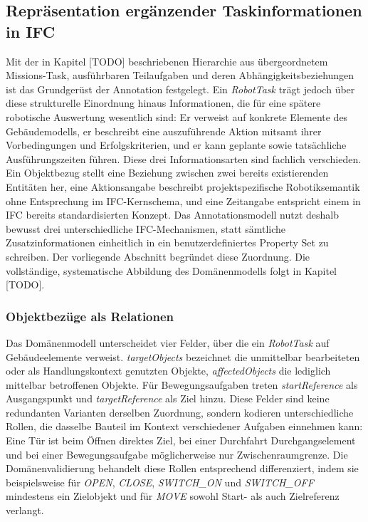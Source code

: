\subsection{Repräsentation ergänzender Taskinformationen in IFC}\label{subsec:Taskinformationen}
Mit der in Kapitel [TODO] beschriebenen Hierarchie aus übergeordnetem Missions-Task, ausführbaren
Teilaufgaben und deren Abhängigkeitsbeziehungen ist das Grundgerüst der Annotation festgelegt. Ein
\textit{RobotTask} trägt jedoch über diese strukturelle Einordnung hinaus Informationen, die für
eine spätere robotische Auswertung wesentlich sind: Er verweist auf konkrete Elemente des
Gebäudemodells, er beschreibt eine auszuführende Aktion mitsamt ihrer Vorbedingungen und
Erfolgskriterien, und er kann geplante sowie tatsächliche Ausführungszeiten führen. Diese drei
Informationsarten sind fachlich verschieden. Ein Objektbezug stellt eine Beziehung zwischen zwei
bereits existierenden Entitäten her, eine Aktionsangabe beschreibt projektspezifische
Robotiksemantik ohne Entsprechung im IFC-Kernschema, und eine Zeitangabe entspricht einem in IFC
bereits standardisierten Konzept. Das Annotationsmodell nutzt deshalb bewusst drei unterschiedliche
IFC-Mechanismen, statt sämtliche Zusatzinformationen einheitlich in ein benutzerdefiniertes Property
Set zu schreiben. Der vorliegende Abschnitt begründet diese Zuordnung. Die vollständige,
systematische Abbildung des Domänenmodells folgt in Kapitel [TODO].

\subsubsection{Objektbezüge als Relationen}
Das Domänenmodell unterscheidet vier Felder, über die ein \textit{RobotTask} auf Gebäudeelemente
verweist. \textit{targetObjects} bezeichnet die unmittelbar bearbeiteten oder als Handlungskontext
genutzten Objekte, \textit{affectedObjects} die lediglich mittelbar betroffenen Objekte. Für
Bewegungsaufgaben treten \textit{startReference} als Ausgangspunkt und \textit{targetReference} als
Ziel hinzu. Diese Felder sind keine redundanten Varianten derselben Zuordnung, sondern kodieren
unterschiedliche Rollen, die dasselbe Bauteil im Kontext verschiedener Aufgaben einnehmen kann: Eine
Tür ist beim Öffnen direktes Ziel, bei einer Durchfahrt Durchgangselement und bei einer
Bewegungsaufgabe möglicherweise nur Zwischenraumgrenze. Die Domänenvalidierung behandelt diese
Rollen entsprechend differenziert, indem sie beispielsweise für \textit{OPEN}, \textit{CLOSE},
\textit{SWITCH\_ON} und \textit{SWITCH\_OFF} mindestens ein Zielobjekt und für \textit{MOVE} sowohl
Start- als auch Zielreferenz verlangt.

